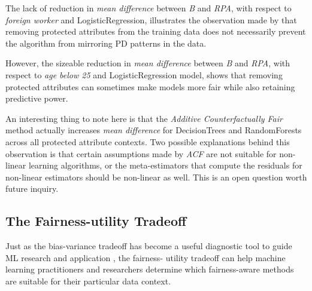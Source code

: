 \documentclass{{interact/interact}}
\begin{document}
The lack of reduction in \emph{mean difference} between \emph{B} and \emph{RPA},
with respect to \emph{foreign worker} and LogisticRegression, illustrates the
observation made by \cite{kusner2017counterfactual} that removing protected
attributes from the training data does not necessarily prevent the algorithm
from mirroring PD patterns in the data.

However, the sizeable reduction in \emph{mean difference} between \emph{B} and
\emph{RPA}, with respect to \emph{age below 25} and LogisticRegression model,
shows that removing protected attributes can sometimes make models more fair
while also retaining predictive power.

An interesting thing to note here is that the \emph{Additive Counterfactually
Fair} method actually increases \emph{mean difference} for DecisionTrees and
RandomForests across all protected attribute contexts. Two possible explanations
behind this observation is that certain assumptions made by \emph{ACF} are not
suitable for non-linear learning algorithms, or the meta-estimators that compute
the residuals for non-linear estimators should be non-linear as well. This
is an open question worth future inquiry.

\subsection{The Fairness-utility Tradeoff}

Just as the bias-variance tradeoff has become a useful diagnostic tool to guide
ML research and application \cite{fortmann2012understanding}, the fairness-
utility tradeoff can help machine learning practitioners and researchers
determine which fairness-aware methods are suitable for their particular data
context.
\end{document}
